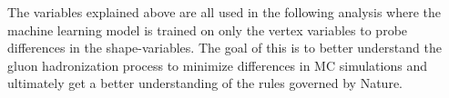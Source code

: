 The variables explained above are all used in the following analysis where the machine learning model is trained on only the vertex variables to probe differences in the shape-variables. The goal of this is to better understand the gluon hadronization process to minimize differences in MC simulations and ultimately get a better understanding of the rules governed by Nature.  
